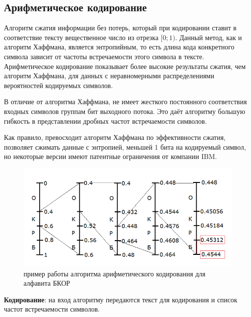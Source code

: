 \begin{figure}[!h]
    
\end{figure}
  


\subsection{Арифметическое кодирование}

Алгоритм сжатия информации без потерь, который при кодировании ставит в соответствие тексту вещественное число из отрезка $[0;1)$. Данный метод, как и алгоритм Хаффмана, является энтропийным, то есть длина кода конкретного символа зависит от частоты встречаемости этого символа в тексте. Арифметическое кодирование показывает более высокие результаты сжатия, чем алгоритм Хаффмана, для данных с неравномерными распределениями вероятностей кодируемых символов.

В отличие от алгоритма Хаффмана, не имеет жесткого постоянного соответствия входных символов группам бит выходного потока. Это даёт алгоритму большую гибкость в представлении дробных частот встречаемости символов.

Как правило, превосходит алгоритм Хаффмана по эффективности сжатия, позволяет сжимать данные с энтропией, меньшей 1 бита на кодируемый символ, но некоторые версии имеют патентные ограничения от компании IBM.


\begin{figure}[H]
    \centering
    \includegraphics[width=.9\textwidth]{img/arif.png}    
    \caption{пример работы алгоритма арифметического кодирования для алфавита БКОР}
\end{figure}


\textbf{Кодирование}: на вход алгоритму передаются текст для кодирования и список частот встречаемости символов.

